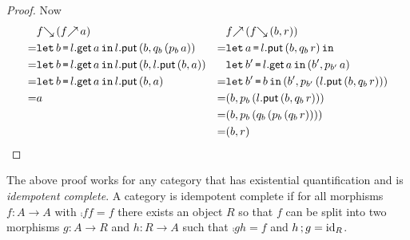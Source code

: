 \documentclass[runningheads,envcountsame]{llncs}
\begin{document}
\begin{proof}
        Now
        \begin{align*}
            & \eapp{\b{f}}{(\eapp{\f{f}}{a})} &
            & \eapp{\f{f}}{(\eapp{\b{f}}{\epair{b}{r}})} \\
          = & \elet{b}{\eapp{\lget{l}}{a}}{\eapp{\lput{l}}{\epair{b}{\eapp{q_b}{(\eapp{p_b}{a})}}}} &
          = & \elet{a}{\eapp{\lput{l}}{\epair{b}{\eapp{q_b}{r}}}}{} \\
          = & \elet{b}{\eapp{\lget{l}}{a}}{\eapp{\lput{l}}{\epair{b}{\eapp{\lput{l}}{\epair{b}{a}}}}} &
            & \elet{b'}{\eapp{\lget{l}}{a}}{\epair{b'}{\eapp{p_{b'}}{a}}} \\
          = & \elet{b}{\eapp{\lget{l}}{a}}{\eapp{\lput{l}}{\epair{b}{a}}} &
          = & \elet{b'}{b}{\epair{b'}{\eapp{p_{b'}}{(\eapp{\lput{l}}{\epair{b}{\eapp{q_b}{r}}})}}} \\
          = & a &
          = & \epair{b}{\eapp{p_b}{(\eapp{\lput{l}}{\epair{b}{\eapp{q_b}{r}}})}} \\
          & & = & \epair{b}{\eapp{p_b}{(\eapp{q_b}{(\eapp{p_b}{(\eapp{q_b}{r})})})}} \\
          & & = & \epair{b}{r}
        \end{align*}
    \end{proof}
    
    \begin{remark}
        The above proof works for any category that has existential quantification and is \emph{idempotent complete}. A category is idempotent complete if for all morphisms $f\colon A \to A$ with $\comp{f}{f} = f$ there exists an object $R$ so that $f$ can be split into two morphisms $g\colon A \to R$ and $h\colon R \to A$ such that $\comp{g}{h} = f$ and $\comp{h}{g} = \id_R$.
    \end{remark}
    
\end{document}
